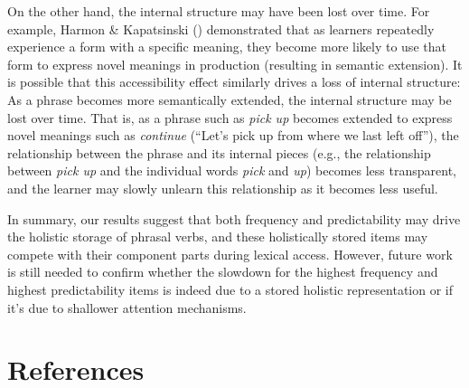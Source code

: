 \documentclass[
  12pt,
  letterpaper,
]{scrreprt}
\begin{document}
On the other hand, the internal structure may have been lost over time.
For example, Harmon \& Kapatsinski
() demonstrated that as
learners repeatedly experience a form with a specific meaning, they
become more likely to use that form to express novel meanings in
production (resulting in semantic extension). It is possible that this
accessibility effect similarly drives a loss of internal structure: As a
phrase becomes more semantically extended, the internal structure may be
lost over time. That is, as a phrase such as \emph{pick up} becomes
extended to express novel meanings such as \emph{continue} (``Let's pick
up from where we last left off''), the relationship between the phrase
and its internal pieces (e.g., the relationship between \emph{pick up}
and the individual words \emph{pick} and \emph{up}) becomes less
transparent, and the learner may slowly unlearn this relationship as it
becomes less useful.

In summary, our results suggest that both frequency and predictability
may drive the holistic storage of phrasal verbs, and these holistically
stored items may compete with their component parts during lexical
access. However, future work is still needed to confirm whether the
slowdown for the highest frequency and highest predictability items is
indeed due to a stored holistic representation or if it's due to
shallower attention mechanisms.


\chapter*{References}\label{references}


\begingroup
\raggedright
\end{document}
